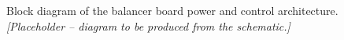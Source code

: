 
\begin{figure}[H]
  \centering
  \caption{Block diagram of the balancer board power and control
    architecture. \emph{[Placeholder -- diagram to be produced from the
    schematic.]}}
  \label{fig:block-diagram}
\end{figure}

